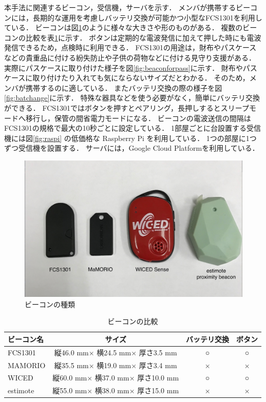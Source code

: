 本手法に関連するビーコン，受信機，サーバを示す．
メンバが携帯するビーコンには，長期的な運用を考慮しバッテリ交換が可能かつ小型なFCS1301\cite{fcs1301}を利用している．
ビーコンは図\ref{fig:beacons}のように様々な大きさや形のものがある．
複数のビーコンの比較を表\ref{tb:beacons}に示す．
ボタンは定期的な電波発信に加えて押した時にも電波発信できるため，点検時に利用できる．
FCS1301の用途は，財布やパスケースなどの貴重品に付ける紛失防止や子供の荷物などに付ける見守り支援がある．
実際にパスケースに取り付けた様子を図\ref{fig:beaconforpass}に示す．
財布やパスケースに取り付けたり入れても気にならないサイズだとわかる．
そのため，メンバが携帯するのに適している．
またバッテリ交換の際の様子を図\ref{fig:batchange}に示す．
特殊な器具などを使う必要がなく，簡単にバッテリ交換ができる．
FCS1301ではボタンを押すとペアリング，長押しするとスリープモードへ移行し，保管の間省電力モードになる．
ビーコンの電波送信の間隔はFCS1301の規格で最大の10秒ごとに設定している．
1部屋ごとに台設置する受信機には図\ref{fig:raspi} の低価格な Raspberry Pi\cite{raspi} を利用している．
1つの部屋に1つずつ受信機を設置する．
サーバには，Google Cloud Platform\cite{gcp}を利用している．

\begin{figure}[H]
  \begin{center}
    \includegraphics[width=150mm]{image/beaconType.jpg}
    \caption{ビーコンの種類}
    \label{fig:beacons}
  \end{center}
\end{figure}

\begin{table}[H]
  \begin{center}
    \caption{ビーコンの比較}
    \label{tb:beacons}
    \begin{tabular}{|l|c|c|c|} \hline
      ビーコン名    & サイズ                           & バッテリ交換 & ボタン \\ \hline \hline
      FCS1301  & 縦46.0 mm× 横24.5 mm× 厚さ3.5 mm  & ○      & ○   \\
      MAMORIO  & 縦35.5 mm× 横19.0 mm× 厚さ3.4 mm  & ×      & ×   \\
      WICED    & 縦60.0 mm× 横37.0 mm× 厚さ10.0 mm & ○      & ○   \\
      estimote & 縦55.0 mm× 横38.0 mm× 厚さ15.0 mm & ×      & ×   \\\hline
    \end{tabular}
  \end{center}
\end{table}

